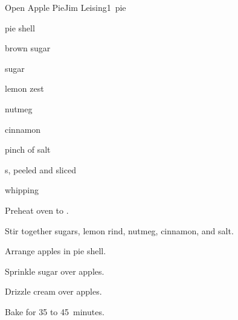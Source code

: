 \begin{recipe}{Open Apple Pie}{Jim Leising}{1~pie}

\begin{ingredients}
\item pie shell
\item \C{\half} brown sugar
\item \C{\half} sugar
\item {} lemon zest
\item \tp{\quarter} nutmeg
\item \tp{\half} cinnamon
\item pinch of salt
\item {} s, peeled and sliced
\item \C{\third} whipping 
\end{ingredients}

\begin{directions}
\item Preheat oven to .
\item Stir together sugars, lemon rind, nutmeg, cinnamon, and salt.
\item Arrange apples in pie shell.
\item Sprinkle sugar over apples.
\item Drizzle cream over apples.
\item Bake for 35 to 45~minutes.
\end{directions}

\end{recipe}
